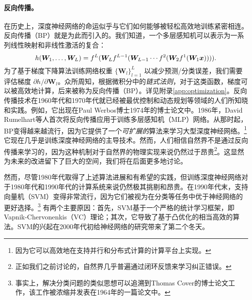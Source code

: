 \documentclass[../../book-main_zh.tex]{subfiles}
\begin{document}
\paragraph{反向传播。}
在历史上，深度神经网络的命运似乎与它们如何能够被轻松高效地训练紧密相连。反向传播（BP）就是为此而引入的。我们知道，一个多层感知机可以表示为一系列线性映射和非线性激活的复合：
\begin{equation}
h(\bm W_1, \ldots, \bm W_L) = f^L(\bm W_Lf^{L-1}(\bm W_{L-1} \cdots f^2(\bm W_2f^1(\bm W_1\bm{x})))).
\end{equation}
为了基于梯度下降算法训练网络权重 $\{\bm W_l\}_{l=1}^L$ 以减少预测/分类误差，我们需要评估梯度 ${\partial h}/{\partial \bm W_l}$。众所周知，根据微积分中的{\em 链式法则}，对于这类函数，梯度可以被高效地计算，后来被称为反向传播（BP）。详见附录\ref{app:optimization}。反向传播技术在1960年代和1970年代就已经被最优控制和动态规划等领域的人们所知晓和实践。例如，它出现在Paul Werbos博士1974年的博士论文中\cite{Werbos-1974, Werbos1994TheRO}。1986年，David Rumelhart等人首次将反向传播应用于训练多层感知机（MLP）网络\cite{Rumelhart1986}。从那时起，BP变得越来越流行，因为它提供了一个{\em 可扩展的}算法来学习大型深度神经网络。\footnote{因为它可以高效地在支持并行和分布式计算的计算平台上实现。} 它现在几乎是训练深度神经网络的主导技术。然而，人们相信自然界不是通过反向传播来学习的，因为这种机制对于自然界的物理实现来说仍然过于昂贵\footnote{正如我们之前讨论的，自然界几乎普遍通过闭环反馈来学习纠正错误。}。这显然为未来的改进留下了巨大的空间，我们将在后面更多地讨论。

然而，尽管1980年代取得了上述算法进展和有希望的实践，但训练深度神经网络对于1980年代和1990年代的计算系统来说仍然极其挑剔和昂贵。在1990年代末，支持向量机（SVM）\cite{SVM-1995}变得非常流行，因为它们被视为在分类等任务中优于神经网络的更好选择。\footnote{事实上，解决分类问题的类似思想可以追溯到Thomas Cover的博士论文工作，该工作被浓缩并发表在1964年的一篇论文中\cite{Cover-1964}。} 有两个主要原因：首先，SVM基于一个严格的统计学习框架，即Vapnik-Chervonenkis（VC）理论；其次，它导致了基于凸优化\cite{BoydVa04}的相当高效的算法。SVM的兴起在2000年代初给神经网络的研究带来了第二个冬天。
\end{document}
